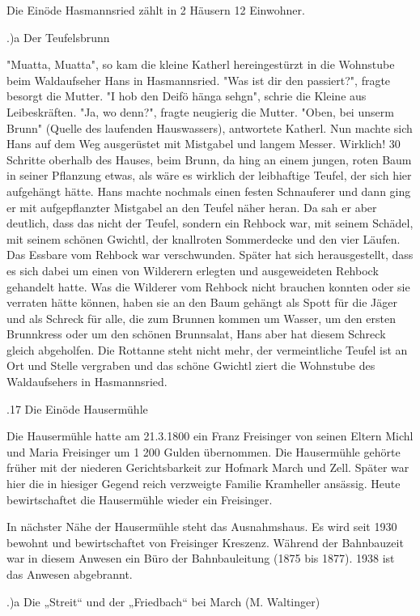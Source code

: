 Die Einöde Hasmannsried zählt in 2 Häusern 12 Einwohner.

.)a Der Teufelsbrunn

"Muatta, Muatta", so kam die kleine Katherl hereingestürzt in die Wohnstube beim
Waldaufseher Hans in Hasmannsried. "Was ist dir den passiert?", fragte besorgt
die Mutter. "I hob den Deifö hänga sehgn", schrie die Kleine aus Leibeskräften.
"Ja, wo denn?", fragte neugierig die Mutter. "Oben, bei unserm Brunn" (Quelle
des laufenden Hauswassers), antwortete Katherl. Nun machte sich Hans auf dem Weg
ausgerüstet mit Mistgabel und langem Messer. Wirklich! 30 Schritte oberhalb des
Hauses, beim Brunn, da hing an einem jungen, roten Baum in seiner Pflanzung
etwas, als wäre es wirklich der leibhaftige Teufel, der sich hier aufgehängt
hätte. Hans machte nochmals einen festen Schnauferer und dann ging er mit
aufgepflanzter Mistgabel an den Teufel näher heran. Da sah er aber deutlich,
dass das nicht der Teufel, sondern ein Rehbock war, mit seinem Schädel, mit
seinem schönen Gwichtl, der knallroten Sommerdecke und den vier Läufen. Das
Essbare vom Rehbock war verschwunden. Später hat sich herausgestellt, dass es
sich dabei um einen von Wilderern erlegten und ausgeweideten Rehbock gehandelt
hatte. Was die Wilderer vom Rehbock nicht brauchen konnten oder sie verraten
hätte können, haben sie an den Baum gehängt als Spott für die Jäger und als
Schreck für alle, die zum Brunnen kommen um Wasser, um den ersten Brunnkress
oder um den schönen Brunnsalat, Hans aber hat diesem Schreck gleich abgeholfen.
Die Rottanne steht nicht mehr, der vermeintliche Teufel ist an Ort und Stelle
vergraben und das schöne Gwichtl ziert die Wohnstube des Waldaufsehers in
Hasmannsried.

.17 Die Einöde Hausermühle

Die Hausermühle hatte am 21.3.1800 ein Franz Freisinger von seinen Eltern Michl
und Maria Freisinger um 1 200 Gulden übernommen. Die Hausermühle gehörte früher
mit der niederen Gerichtsbarkeit zur Hofmark March und Zell. Später war hier die
in hiesiger Gegend reich verzweigte Familie Kramheller ansässig. Heute
bewirtschaftet die Hausermühle wieder ein Freisinger.

In nächster Nähe der Hausermühle steht das Ausnahmshaus. Es wird seit 1930
bewohnt und bewirtschaftet von Freisinger Kreszenz. Während der Bahnbauzeit war
in diesem Anwesen ein Büro der Bahnbauleitung (1875 bis 1877). 1938 ist das
Anwesen abgebrannt.

.)a Die „Streit“ und der „Friedbach“ bei March (M. Waltinger)

